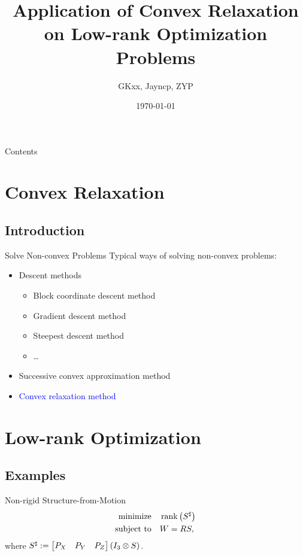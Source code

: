 \documentclass{beamer}
\title{Application of Convex Relaxation on Low-rank Optimization Problems}
\author{GKxx, Jayncp, ZYP}
\date{\today}
\newcommand{\blue}[1]{\textcolor{blue}{#1}}
\begin{document}
\begin{frame}
    \maketitle
\end{frame}

\begin{frame}{Contents}
    \tableofcontents
\end{frame}

\section{Convex Relaxation}

\subsection{Introduction}

\begin{frame}{Solve Non-convex Problems}
    Typical ways of solving non-convex problems:
    \begin{itemize}
        \item Descent methods
        \begin{itemize}
            \item Block coordinate descent method
            \item Gradient descent method
            \item Steepest descent method
            \item \dots
        \end{itemize}
        \item Successive convex approximation method
        \item \blue{Convex relaxation method}
    \end{itemize}
\end{frame}

\section{Low-rank Optimization}

\subsection{Examples}

\begin{frame}{Non-rigid Structure-from-Motion}
    \[\begin{aligned}
        \textnormal{minimize}\quad & \operatorname{rank}\left(S^\sharp\right)\\
        \textnormal{subject to}\quad & W=RS,
    \end{aligned}\]
    where \(S^\sharp:=\begin{bmatrix}P_X & P_Y & P_Z\end{bmatrix}\left(I_3\otimes S\right)\).
\end{frame}
\end{document}
